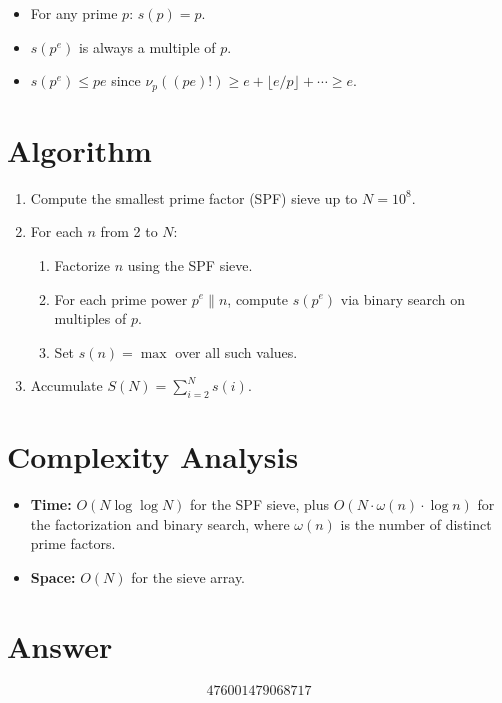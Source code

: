 \documentclass[12pt]{article}
\theoremstyle{definition}
\begin{document}
\begin{itemize}
\item For any prime $p$: $s(p) = p$.
\item $s(p^e)$ is always a multiple of $p$.
\item $s(p^e) \leq pe$ since $\nu_p((pe)!) \geq e + \lfloor e/p \rfloor + \cdots \geq e$.
\end{itemize}

\section{Algorithm}

\begin{enumerate}
\item Compute the smallest prime factor (SPF) sieve up to $N = 10^8$.
\item For each $n$ from 2 to $N$:
    \begin{enumerate}
    \item Factorize $n$ using the SPF sieve.
    \item For each prime power $p^e \| n$, compute $s(p^e)$ via binary search on multiples of $p$.
    \item Set $s(n) = \max$ over all such values.
    \end{enumerate}
\item Accumulate $S(N) = \sum_{i=2}^{N} s(i)$.
\end{enumerate}

\section{Complexity Analysis}

\begin{itemize}
\item \textbf{Time:} $O(N \log \log N)$ for the SPF sieve, plus $O(N \cdot \omega(n) \cdot \log n)$ for the factorization and binary search, where $\omega(n)$ is the number of distinct prime factors.
\item \textbf{Space:} $O(N)$ for the sieve array.
\end{itemize}

\section{Answer}

\[
\boxed{476001479068717}
\]
\end{document}
